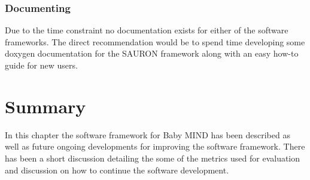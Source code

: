 \subsubsection{Documenting}
Due to the time constraint no documentation exists for either of the software frameworks. The direct recommendation would be to spend time developing some doxygen documentation for the SAURON framework along with an easy how-to guide for new users.

\section{Summary}
In this chapter the software framework for Baby MIND has been described as well as future ongoing developments for improving the software framework. There has been a short discussion detailing the some of the metrics used for evaluation and discussion on how to continue the software development.

